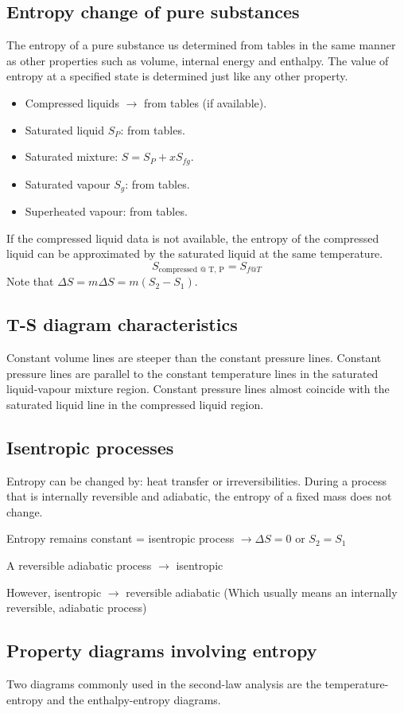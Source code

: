 \documentclass[class=report, crop=false, 12pt,a4paper]{standalone}
\begin{document}
\subsection{Entropy change of pure substances}
The entropy of a pure substance us determined from tables in the same manner as other properties such as volume, internal energy and enthalpy. The value of entropy at a specified state is determined just like any other property.
\begin{itemize}[noitemsep]
  \item Compressed liquids \(\rightarrow\) from tables (if available).
  \item Saturated liquid \(S_P\): from tables.
  \item Saturated mixture: \(S=S_P + xS_{fg}\).
  \item Saturated vapour \(S_g\): from tables.
  \item Superheated vapour: from tables.
\end{itemize}
If the compressed liquid data is not available, the entropy of the compressed liquid can be approximated by the saturated liquid at the same temperature.
\[ S_{\textrm{compressed @ T, P}} = S_{f@T} \]
Note that \( \Delta S = m \Delta S = m(S_2 - S_1)\).
\subsection{T-S diagram characteristics}
Constant volume lines are steeper than the constant pressure lines. Constant pressure lines are parallel to the constant temperature lines in the saturated liquid-vapour mixture region. Constant pressure lines almost coincide with the saturated liquid line in the compressed liquid region. 
\subsection{Isentropic processes}
Entropy can be changed by: heat transfer or irreversibilities. During a process that is internally reversible and adiabatic, the entropy of a fixed mass does not change.
\begin{center}
  Entropy remains constant = isentropic process \(\rightarrow \Delta S = 0 \textrm{ or } S_2 = S_1 \)
\end{center}
\begin{center}
  A reversible adiabatic process \(\rightarrow\) isentropic
\end{center}
\begin{center}
  However, isentropic \(\rightarrow\) reversible adiabatic (Which usually means an internally reversible, adiabatic process)
\end{center}
\subsection{Property diagrams involving entropy}
Two diagrams commonly used in the second-law analysis are the temperature-entropy and the enthalpy-entropy diagrams. 
\end{document}
